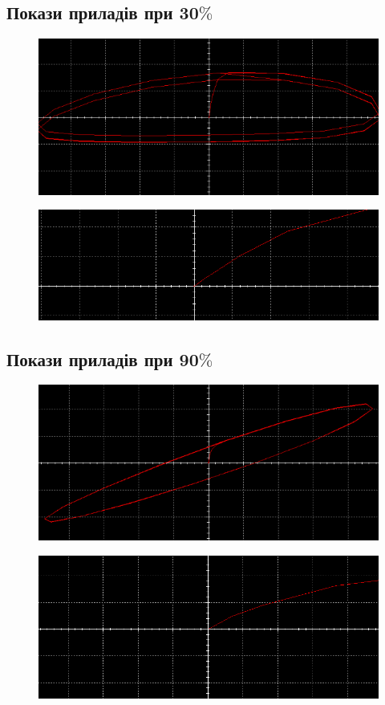 \subsection{Покази приладів при 30$\%$}

\begin{figure}[ht]
\centering
\includegraphics[width=1\linewidth]{Pic/30_1.png}
\end{figure}


\begin{figure}[ht]
\centering
\includegraphics[width=1\linewidth]{Pic/30_2.png}
\end{figure}
\newpage

\subsection{Покази приладів при 90$\%$}

\begin{figure}[ht]
\centering
\includegraphics[width=1\linewidth]{Pic/90_1.png}
\end{figure}


\begin{figure}[ht]
\centering
\includegraphics[width=1\linewidth]{Pic/90_2.png}
\end{figure}
\newpage
